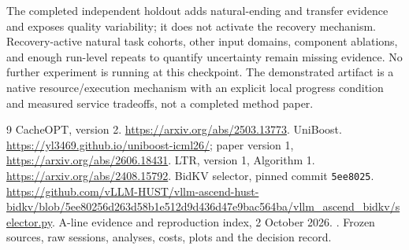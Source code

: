 \documentclass[10pt]{article}
\begin{document}
The completed independent holdout adds natural-ending and transfer evidence and exposes quality variability; it does not activate the recovery mechanism. Recovery-active natural task cohorts, other input domains, component ablations, and enough run-level repeats to quantify uncertainty remain missing evidence. No further experiment is running at this checkpoint. The demonstrated artifact is a native resource/execution mechanism with an explicit local progress condition and measured service tradeoffs, not a completed method paper.

\begin{thebibliography}{9}
\small
\setlength{\itemsep}{2pt}
\setlength{\parskip}{0pt}
 CacheOPT, version 2. \url{https://arxiv.org/abs/2503.13773}.
 UniBoost. \url{https://yl3469.github.io/uniboost-icml26/}; paper version 1, \url{https://arxiv.org/abs/2606.18431}.
 LTR, version 1, Algorithm 1. \url{https://arxiv.org/abs/2408.15792}.
 BidKV selector, pinned commit \texttt{5ee8025}. \url{https://github.com/vLLM-HUST/vllm-ascend-hust-bidkv/blob/5ee80256d263d58b1e512d9d436d47e9bac564ba/vllm_ascend_bidkv/selector.py}.
 A-line evidence and reproduction index, 2 October 2026. . Frozen sources, raw sessions, analyses, costs, plots and the decision record.
\end{thebibliography}
\end{document}
